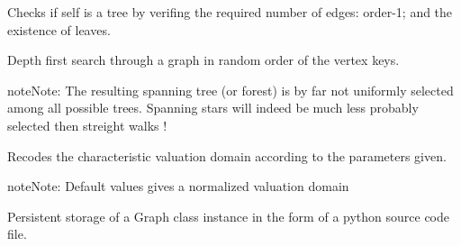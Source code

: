 \documentclass[letterpaper,10pt,english]{sphinxmanual}
\begin{document}
\begin{fulllineitems}
\begin{fulllineitems}
\end{fulllineitems}


\begin{fulllineitems}
\label{techDoc:graphs.Graph.isTree}
Checks if self is a tree by verifing the required number of
edges: order-1; and the existence of leaves.

\end{fulllineitems}


\begin{fulllineitems}
\label{techDoc:graphs.Graph.randomDepthFirstSearch}
Depth first search through a graph in random order of the vertex keys.

\begin{notice}{note}{Note:}
The resulting spanning tree (or forest) is by far not uniformly selected
among all possible trees. Spanning stars will indeed be much less
probably selected then streight walks !
\end{notice}

\end{fulllineitems}


\begin{fulllineitems}
\label{techDoc:graphs.Graph.recodeValuation}
Recodes the characteristic valuation domain according
to the parameters given.

\begin{notice}{note}{Note:}
Default values gives a normalized valuation domain
\end{notice}

\end{fulllineitems}


\begin{fulllineitems}
\label{techDoc:graphs.Graph.save}
Persistent storage of a Graph class instance in the form of a python source code file.


\end{fulllineitems}
\end{fulllineitems}
\end{document}
